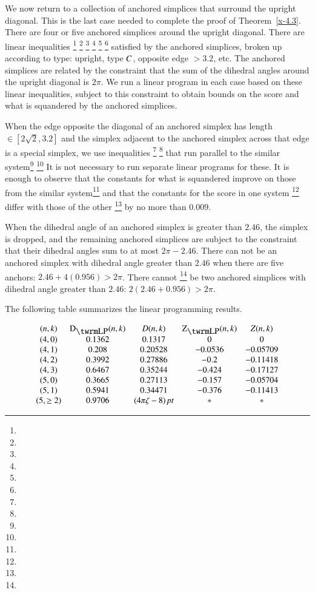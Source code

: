 We now return to a collection of anchored simplices that surround
the upright diagonal.  This is the last case needed to complete
the proof of Theorem~\ref{x-4.3}. There are four or five anchored
simplices around the upright diagonal.
There are linear inequalities%
\footnote{} %
\footnote{} %
\footnote{} %
\footnote{} %
\footnote{} %
\footnote{} %
satisfied by the anchored simplices, broken
up according to type: upright, type $C$, opposite edge $>3.2$,
etc. The anchored simplices are related by the constraint that the
sum of the dihedral angles around the upright diagonal is $2\pi$.
We run a linear program in each case based on these linear
inequalities, subject to this constraint to obtain bounds on the
score and what is squandered by the anchored simplices.

When the edge opposite the diagonal of an anchored simplex has length
$\in[2\sqrt{2},3.2]$ and the simplex adjacent to the anchored simplex
across that edge is a special simplex, we use inequalities%
\footnote{} %
\footnote{} %
that run parallel to the similar system\footnote{} %
\footnote{} %
It is not
necessary to run separate linear programs for these.  It is enough to
observe that the constants for what is squandered improve on those from
the similar system\footnote{} %
and that the constants for the score in one system%
\footnote{} %
differ with those of the other%
\footnote{} %
by no more than $0.009$.

When the dihedral angle of an anchored simplex is greater than $2.46$,
the simplex is dropped, and the remaining anchored simplices are subject
to the constraint that their dihedral angles sum to at most $2\pi-2.46$.
There can not be an anchored simplex with dihedral angle greater than
$2.46$ when there are five anchors: $2.46+4 (0.956)>2\pi$. There cannot%
\footnote{} %
be two anchored simplices with dihedral angle greater than $2.46$:
$2(2.46+0.956)>2\pi$.

The following table summarizes the linear programming results.

$$
\begin{matrix}
(n,k)   &   \DLP(n,k) & D(n,k)      &\ZLP(n,k)  &Z(n,k)\\
(4,0)   &   0.1362  &   0.1317  &   0   &   0\\
(4,1)   &   0.208   &   0.20528 &-0.0536&   -0.05709\\
(4,2)   &   0.3992  &   0.27886 &-0.2   &   -0.11418\\
(4,3)   &  0.6467   &   0.35244 &-0.424 &   -0.17127\\
(5,0)   &   0.3665  &   0.27113 &-0.157 &   -0.05704\\
(5,1)   &  0.5941   &   0.34471 &-0.376 &   -0.11413\\
(5,\ge2)&  0.9706   &  \squander    &*          &   *
\end{matrix}
$$

